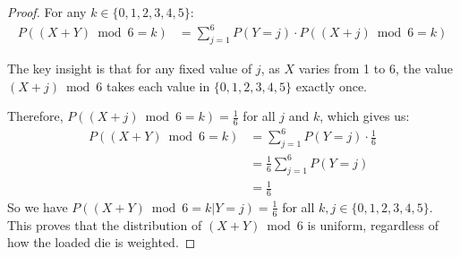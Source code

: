 \documentclass[letterpaper, 11pt]{article}
\newcommand{\1}{\mathds{1}}	%
\theoremstyle{definition}
\begin{document}
\begin{proof}
For any $k \in \{0,1,2,3,4,5\}$:
\begin{align*}
P((X+Y) \bmod 6 = k) &= \sum_{j=1}^6 P(Y=j) \cdot P((X+j) \bmod 6 = k)
\end{align*}

The key insight is that for any fixed value of $j$, as $X$ varies from 1 to 6, the value $(X+j) \bmod 6$ takes each value in $\{0,1,2,3,4,5\}$ exactly once.

Therefore, $P((X+j) \bmod 6 = k) = \frac{1}{6}$ for all $j$ and $k$, which gives us:
\begin{align*}
P((X+Y) \bmod 6 = k) &= \sum_{j=1}^6 P(Y=j) \cdot \frac{1}{6}\\
&= \frac{1}{6}\sum_{j=1}^6 P(Y=j)\\
&= \frac{1}{6}
\end{align*}
So we have $P((X+Y) \bmod 6 = k|Y=j) = \frac{1}{6}$ for all $k,j \in \{0,1,2,3,4,5\}$.
\\This proves that the distribution of $(X+Y) \bmod 6$ is uniform, regardless of how the loaded die is weighted.
\end{proof}
\end{document}
